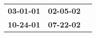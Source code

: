 \begin{supertabular}{p{0.33\columnwidth}p{0.33\columnwidth}p{0.33\columnwidth}}
 \textbf{03-01-01\textsuperscript{}} &  \textbf{02-05-02\textsuperscript{}} \\
 \textbf{10-24-01\textsuperscript{}} &  \textbf{07-22-02\textsuperscript{}} \\
\end{supertabular}
